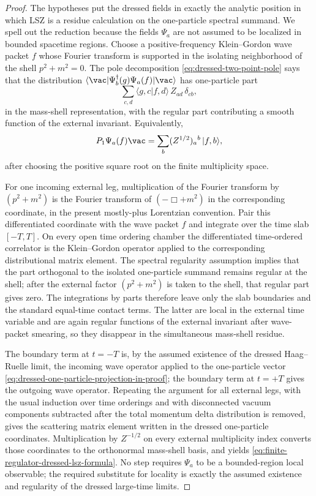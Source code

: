 \begin{proof}
The hypotheses put the dressed fields in exactly the analytic position in
which LSZ is a residue calculation on the one-particle spectral summand.  We
spell out the reduction because the fields \(\Psi_a\) are not assumed to be
localized in bounded spacetime regions.  Choose a positive-frequency
Klein--Gordon wave packet \(f\) whose Fourier transform is supported in the
isolating neighborhood of the shell \(p^2+m^2=0\).  The pole decomposition
\eqref{eq:dressed-two-point-pole} says that the distribution
\(\langle\vac|\Psi_b^\dagger(g)\Psi_a(f)|\vac\rangle\) has one-particle
part
\[
  \sum_{c,d}
  \langle g,c|f,d\rangle\, Z_{ad}\,\delta_{cb},
\]
in the mass-shell representation, with the regular part contributing a smooth
function of the external invariant.  Equivalently,
\begin{equation}
  P_1\Psi_a(f)\vac
  =
  \sum_b (Z^{1/2})_a{}^b\,|f,b\rangle ,
  \label{eq:dressed-one-particle-projection-in-proof}
\end{equation}
after choosing the positive square root on the finite multiplicity space.

For one incoming external leg, multiplication of the Fourier transform by
\((p^2+m^2)\) is the Fourier transform of
\((-\Box+m^2)\) in the corresponding coordinate, in the present mostly-plus
Lorentzian convention.  Pair this differentiated coordinate with the wave
packet \(f\) and integrate over the time slab \([-T,T]\).  On every open time
ordering chamber the differentiated time-ordered correlator is the
Klein--Gordon operator applied to the corresponding distributional matrix
element.  The spectral regularity assumption implies that the part orthogonal
to the isolated one-particle summand remains regular at the shell; after the
external factor \((p^2+m^2)\) is taken to the shell, that regular part gives
zero.  The integrations by parts therefore leave only the slab boundaries
and the standard equal-time contact terms.  The latter are local in the
external time variable and are again regular functions of the external
invariant after wave-packet smearing, so they disappear in the simultaneous
mass-shell residue.

The boundary term at \(t=-T\) is, by the assumed existence of the dressed
Haag--Ruelle limit, the incoming wave operator applied to the one-particle
vector \eqref{eq:dressed-one-particle-projection-in-proof}; the boundary term
at \(t=+T\) gives the outgoing wave operator.  Repeating the argument for all
external legs, with the usual induction over time orderings and with
disconnected vacuum components subtracted after the total momentum delta
distribution is removed, gives the scattering matrix element written in the
dressed one-particle coordinates.  Multiplication by \(Z^{-1/2}\) on every
external multiplicity index converts those coordinates to the orthonormal
mass-shell basis, and yields
\eqref{eq:finite-regulator-dressed-lsz-formula}.  No step requires
\(\Psi_a\) to be a bounded-region local observable; the required substitute
for locality is exactly the assumed existence and regularity of the dressed
large-time limits.
\end{proof}

